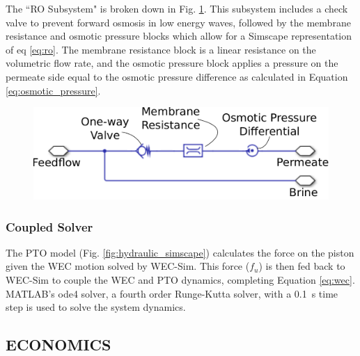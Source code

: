 \documentclass[twocolumn,10pt]{asme2e}
\begin{document}
The ``RO Subsystem" is broken down in Fig. \ref{fig:ro_simscape}. This subsystem includes a check valve to prevent forward osmosis in low energy waves, followed by the membrane resistance and osmotic pressure blocks which allow for a Simscape representation of eq \ref{eq:ro}. The membrane resistance block is a linear resistance on the volumetric flow rate, and the osmotic pressure block applies a pressure on the permeate side equal to the osmotic pressure difference as calculated in Equation \ref{eq:osmotic_pressure}.

\begin{figure}[h]
    \centering
    \includegraphics[width=0.7\linewidth]{../figs/simscape_ro.pdf}
    \label{fig:ro_simscape}
\end{figure}

\subsubsection{Coupled Solver}

The PTO model (Fig. \ref{fig:hydraulic_simscape}) calculates the force on the piston given the WEC motion solved by WEC-Sim. This force ($f_u$) is then fed back to WEC-Sim to couple the WEC and PTO dynamics, completing Equation \ref{eq:wec}. MATLAB's ode4 solver, a fourth order Runge-Kutta solver, with a 0.1~s time step is used to solve the system dynamics. 


\subsection{ECONOMICS} \label{sec:econ}
\end{document}
